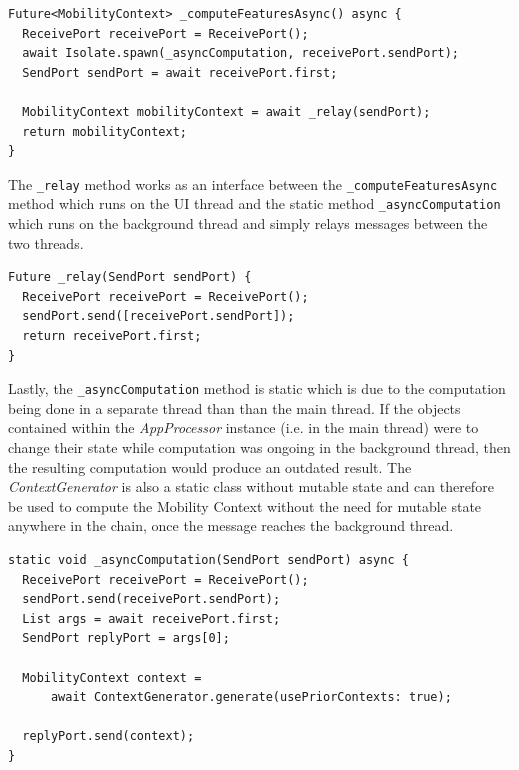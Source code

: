 \begin{verbatim}
Future<MobilityContext> _computeFeaturesAsync() async {
  ReceivePort receivePort = ReceivePort();
  await Isolate.spawn(_asyncComputation, receivePort.sendPort);
  SendPort sendPort = await receivePort.first;

  MobilityContext mobilityContext = await _relay(sendPort);
  return mobilityContext;
}
\end{verbatim}

The \verb|_relay| method works as an interface between the \verb|_computeFeaturesAsync| method which runs on the UI thread and the static method \verb|_asyncComputation| which runs on the background thread and simply relays messages between the two threads.

\begin{verbatim}
Future _relay(SendPort sendPort) {
  ReceivePort receivePort = ReceivePort();
  sendPort.send([receivePort.sendPort]);
  return receivePort.first;
}
\end{verbatim}

Lastly, the \verb|_asyncComputation| method is static which is due to the computation being done in a separate thread than than the main thread. If the objects contained within the \textit{AppProcessor} instance (i.e. in the main thread) were to change their state while computation was ongoing in the background thread, then the resulting computation would produce an outdated result. The \textit{ContextGenerator} is also a static class without mutable state and can therefore be used to compute the Mobility Context without the need for mutable state anywhere in the chain, once the message reaches the background thread.

\begin{verbatim}
static void _asyncComputation(SendPort sendPort) async {
  ReceivePort receivePort = ReceivePort();
  sendPort.send(receivePort.sendPort);
  List args = await receivePort.first;
  SendPort replyPort = args[0];

  MobilityContext context =
      await ContextGenerator.generate(usePriorContexts: true);

  replyPort.send(context);
}
\end{verbatim}

